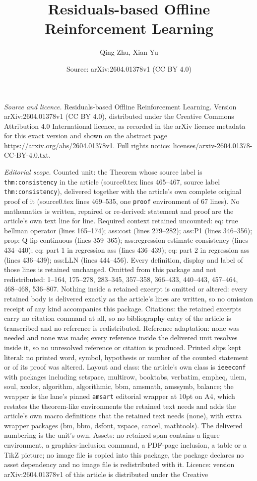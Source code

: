 \documentclass[10pt,a4paper]{amsart}
\title[Residuals-based Offline Reinforcement Learning]{Residuals-based Offline Reinforcement Learning}
\author{Qing Zhu, Xian Yu}
\date{Source: arXiv:2604.01378v1 (CC BY 4.0)}
\begin{document}
\maketitle

\noindent\emph{Source and licence.} Residuals-based Offline Reinforcement Learning. Version arXiv:2604.01378v1 (CC BY 4.0), distributed under the Creative Commons Attribution 4.0 International licence, as recorded in the arXiv licence metadata for this exact version and shown on the abstract page https://arxiv.org/abs/2604.01378v1. Full rights notice: licenses/arxiv-2604.01378-CC-BY-4.0.txt.\par\smallskip

\noindent\textit{Editorial scope.} Counted unit: the Theorem whose source label is \texttt{thm:consistency} in the article (source0.tex lines 465--467, source label \texttt{thm:consistency}), delivered together with the article's own complete original proof of it (source0.tex lines 469--535, one \texttt{proof} environment of 67 lines). No mathematics is written, repaired or re-derived: statement and proof are the article's own text line for line. Required context retained uncounted: eq: true bellman operator (lines 165--174); ass:cost (lines 279--282); ass:P1 (lines 346--356); prop: Q lip continuous (lines 359--365); ass:regression estimate consistency (lines 434--440); eq: part 1 in regression ass (lines 436--439); eq: part 2 in regression ass (lines 436--439); ass:LLN (lines 444--456). Every definition, display and label of those lines is retained unchanged. Omitted from this package and not redistributed: 1--164, 175--278, 283--345, 357--358, 366--433, 440--443, 457--464, 468--468, 536--807. Nothing inside a retained excerpt is omitted or altered: every retained body is delivered exactly as the article's lines are written, so no omission receipt of any kind accompanies this package. Citations: the retained excerpts carry no citation command at all, so no bibliography entry of the article is transcribed and no reference is redistributed. Reference adaptation: none was needed and none was made; every reference inside the delivered unit resolves inside it, so no unresolved reference or citation is produced. Printed slips kept literal: no printed word, symbol, hypothesis or number of the counted statement or of its proof was altered. Layout and class: the article's own class is \texttt{ieeeconf} with packages including setspace, multirow, booktabs, verbatim, empheq, ulem, soul, xcolor, algorithm, algorithmic, bbm, amsmath, amssymb, balance; the wrapper is the lane's pinned \texttt{amsart} editorial wrapper at 10pt on A4, which restates the theorem-like environments the retained text needs and adds the article's own macro definitions that the retained text needs (none), with extra wrapper packages (bm, bbm, dsfont, xspace, cancel, mathtools). The delivered numbering is the unit's own. Assets: no retained span contains a figure environment, a graphics-inclusion command, a PDF-page inclusion, a table or a TikZ picture; no image file is copied into this package, the package declares no asset dependency and no image file is redistributed with it. Licence: version arXiv:2604.01378v1 of this article is distributed under the Creative 
\end{document}
